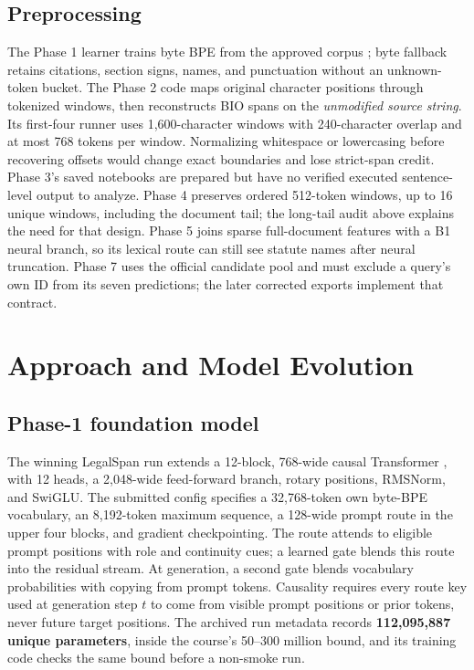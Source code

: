 \documentclass[11pt,oneside]{article}
\begin{document}
\subsection{Preprocessing}
The Phase 1 learner trains byte BPE from the approved corpus \cite{sennrich2016bpe}; byte fallback retains citations, section signs, names, and punctuation without an unknown-token bucket. The Phase 2 code maps original character positions through tokenized windows, then reconstructs BIO spans on the \emph{unmodified source string}. Its first-four runner uses 1,600-character windows with 240-character overlap and at most 768 tokens per window. Normalizing whitespace or lowercasing before recovering offsets would change exact boundaries and lose strict-span credit. Phase 3's saved notebooks are prepared but have no verified executed sentence-level output to analyze. Phase 4 preserves ordered 512-token windows, up to 16 unique windows, including the document tail; the long-tail audit above explains the need for that design. Phase 5 joins sparse full-document features with a B1 neural branch, so its lexical route can still see statute names after neural truncation. Phase 7 uses the official candidate pool and must exclude a query's own ID from its seven predictions; the later corrected exports implement that contract.

\section{Approach and Model Evolution}
\subsection{Phase-1 foundation model}
The winning LegalSpan run extends a 12-block, 768-wide causal Transformer \cite{vaswani2017attention}, with 12 heads, a 2,048-wide feed-forward branch, rotary positions, RMSNorm, and SwiGLU. The submitted config specifies a 32,768-token own byte-BPE vocabulary, an 8,192-token maximum sequence, a 128-wide prompt route in the upper four blocks, and gradient checkpointing. The route attends to eligible prompt positions with role and continuity cues; a learned gate blends this route into the residual stream. At generation, a second gate blends vocabulary probabilities with copying from prompt tokens. Causality requires every route key used at generation step $t$ to come from visible prompt positions or prior tokens, never future target positions. The archived run metadata records \textbf{112,095,887 unique parameters}, inside the course's 50--300 million bound, and its training code checks the same bound before a non-smoke run.
\end{document}
